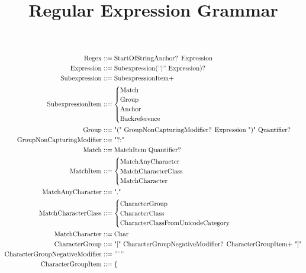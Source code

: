 \documentclass{article}
\title{Regular Expression Grammar}
\author{}
\date{}
\begin{document}
	
	\maketitle
	
	\begin{align*}
		\text{Regex} 			&::= \text{StartOfStringAnchor? Expression} \\
		\text{Expression} 		&::= \text{Subexpression} ( "|" \text{ Expression)?} \\
		\text{Subexpression}	&::= \text{SubexpressionItem+} \\
		\text{SubexpressionItem} &::= \begin{cases}
											\text{Match} \\
											\text{Group} \\
											\text{Anchor} \\
											\text{Backreference}
									 \end{cases} \\
		\text{Group} 			&::= \text{"(" GroupNonCapturingModifier? Expression ")" Quantifier?} \\
		\text{GroupNonCapturingModifier} &::= \text{"?:"} \\
		\text{Match} 			&::= \text{MatchItem Quantifier?} \\
		\text{MatchItem} 		&::= \begin{cases}
										\text{MatchAnyCharacter} \\
										\text{MatchCharacterClass} \\
										\text{MatchCharacter}
									\end{cases} \\
		\text{MatchAnyCharacter} &::= \text{"."} \\
		\text{MatchCharacterClass} &::= \begin{cases}
											\text{CharacterGroup} \\
											\text{CharacterClass} \\
											\text{CharacterClassFromUnicodeCategory}
										\end{cases} \\
		\text{MatchCharacter} &::= \text{Char} \\
		\text{CharacterGroup} &::= \text{"[" CharacterGroupNegativeModifier? CharacterGroupItem+ "]"} \\
		\text{CharacterGroupNegativeModifier} &::= "\char`\^" \\
		\text{CharacterGroupItem} &::= \begin{cases}

\end{cases}
\end{align*}
\end{document}
